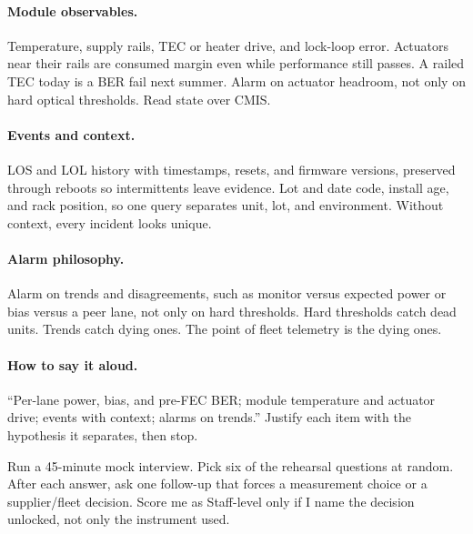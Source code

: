 \paragraph{Module observables.}
Temperature, supply rails, TEC or heater drive, and lock-loop
error. Actuators near their rails are consumed margin even while performance
still passes. A railed TEC today is a BER fail next summer. Alarm on actuator
headroom, not only on hard optical thresholds. Read state over
CMIS.

\paragraph{Events and context.}
LOS and LOL history with timestamps, resets, and
firmware versions, preserved through reboots so intermittents leave evidence.
Lot and date code, install age, and rack position, so one query separates
unit, lot, and environment. Without context, every incident looks unique.

\paragraph{Alarm philosophy.}
Alarm on trends and disagreements, such as monitor versus expected power or
bias versus a peer lane, not only on hard thresholds. Hard thresholds catch
dead units. Trends catch dying ones. The point of fleet telemetry is the
dying ones.

\paragraph{How to say it aloud.}
``Per-lane power, bias, and pre-FEC BER; module temperature and actuator
drive; events with context; alarms on trends.'' Justify each item with the
hypothesis it separates, then stop.

{Run a 45-minute mock interview. Pick six of the rehearsal questions at random.
After each answer, ask one follow-up that forces a measurement choice or a
supplier/fleet decision. Score me as Staff-level only if I name the decision
unlocked, not only the instrument used.}

